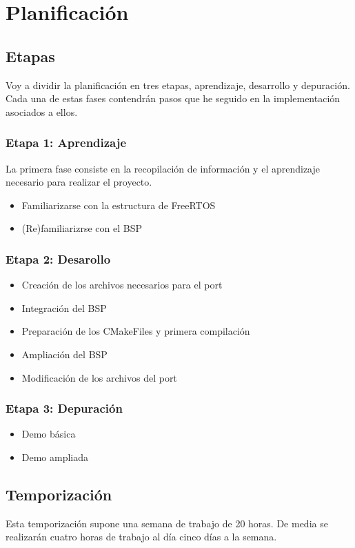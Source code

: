 \chapter{Planificación}

\section{Etapas}

Voy a dividir la planificación en tres etapas, aprendizaje, desarrollo y depuración. Cada una de estas fases contendrán pasos que he seguido en la implementación asociados a ellos.

\subsection{Etapa 1: Aprendizaje}
La primera fase consiste en la recopilación de información y el aprendizaje necesario para realizar el proyecto.

\begin{itemize}
\item Familiarizarse con la estructura de FreeRTOS
\item (Re)familiarizrse con el BSP
\end{itemize}

\subsection{Etapa 2: Desarollo}
\begin{itemize}
\item Creación de los archivos necesarios para el port
\item Integración del BSP
\item Preparación de los CMakeFiles y primera compilación
\item Ampliación del BSP
\item Modificación de los archivos del port
\end{itemize}

\subsection{Etapa 3: Depuración}
\begin{itemize}
\item Demo básica
\item Demo ampliada
\end{itemize}

\section{Temporización}
Esta temporización supone una semana de trabajo de 20 horas. De media se realizarán cuatro horas de trabajo al día cinco días a la semana.

